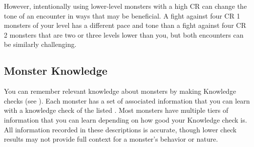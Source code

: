         However, intentionally using lower-level monsters with a high CR can change the tone of an encounter in ways that may be beneficial.
        A fight against four CR 1 monsters of your level has a different pace and tone than a fight against four CR 2 monsters that are two or three levels lower than you, but both encounters can be similarly challenging.

    \subsection{Monster Knowledge}
        You can remember relevant knowledge about monsters by making Knowledge checks (see ).
        Each monster has a set of associated information that you can learn with a knowledge check of the listed .
        Most monsters have multiple tiers of information that you can learn depending on how good your Knowledge check is.
        All information recorded in these descriptions is accurate, though lower check results may not provide full context for a monster's behavior or nature.


